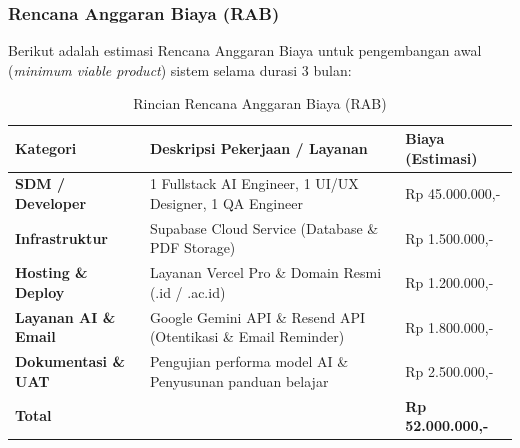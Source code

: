 \documentclass[12pt,a4paper]{article}
\begin{document}
\subsubsection{Rencana Anggaran Biaya (RAB)}
Berikut adalah estimasi Rencana Anggaran Biaya untuk pengembangan awal (\textit{minimum viable product}) sistem selama durasi 3 bulan:
\begin{table}[htbp]
    \centering
    \caption{Rincian Rencana Anggaran Biaya (RAB)}
    \vspace{0.2cm}
    \begin{tabularx}{\textwidth}{lXl}
        \toprule
        \textbf{Kategori} & \textbf{Deskripsi Pekerjaan / Layanan} & \textbf{Biaya (Estimasi)} \\
        \midrule
        \textbf{SDM / Developer} & 1 Fullstack AI Engineer, 1 UI/UX Designer, 1 QA Engineer & Rp 45.000.000,- \\
        \textbf{Infrastruktur} & Supabase Cloud Service (Database \& PDF Storage) & Rp 1.500.000,- \\
        \textbf{Hosting \& Deploy} & Layanan Vercel Pro \& Domain Resmi (.id / .ac.id) & Rp 1.200.000,- \\
        \textbf{Layanan AI \& Email} & Google Gemini API \& Resend API (Otentikasi \& Email Reminder) & Rp 1.800.000,- \\
        \textbf{Dokumentasi \& UAT} & Pengujian performa model AI \& Penyusunan panduan belajar & Rp 2.500.000,- \\
        \midrule
        \textbf{Total} & & \textbf{Rp 52.000.000,-} \\
        \bottomrule
    \end{tabularx}
\end{table}
\end{document}
